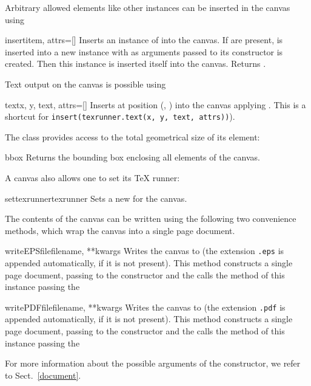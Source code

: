 Arbitrary allowed elements like other  instances can
be inserted in the canvas using

\begin{methoddesc}{insert}{item, attrs=[]}
  Inserts an instance of  into the canvas.  If
   are present,  is inserted into a new
  instance with  as arguments passed to its
  constructor is created. Then this  instance is
  inserted itself into the canvas. Returns .
\end{methoddesc}

Text output on the canvas is possible using

\begin{methoddesc}{text}{x, y, text, attrs=[]}
  Inserts  at position (, ) into the
  canvas applying . This is a shortcut for
  \texttt{insert(texrunner.text(x, y, text, attrs))}).
\end{methoddesc}

The  class provides access to the total geometrical size
of its element:

\begin{methoddesc}{bbox}{}
  Returns the bounding box enclosing all elements of the canvas.
\end{methoddesc}

A canvas also allows one to set its TeX runner:

\begin{methoddesc}{settexrunner}{texrunner}
  Sets a new  for the canvas.
\end{methoddesc}

The contents of the canvas can be written using the following two
convenience methods, which wrap the canvas into a single page
document.

\begin{methoddesc}{writeEPSfile}{filename, **kwargs}
  Writes the canvas to  (the extension \texttt{.eps} is
  appended automatically, if it is not present). This method
  constructs a single page document, passing  to the
   constructor and the calls the
   method of this 
  instance passing the 

\end{methoddesc}

\begin{methoddesc}{writePDFfile}{filename, **kwargs}
  Writes the canvas to  (the extension \texttt{.pdf} is
  appended automatically, if it is not present). This method
  constructs a single page document, passing  to the
   constructor and the calls the
   method of this 
  instance passing the 
\end{methoddesc}

For more information about the possible arguments of the
 constructor, we refer to Sect.~\ref{document}.

